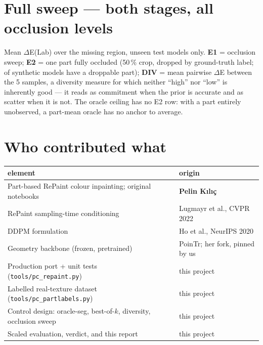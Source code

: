 \documentclass[11pt]{article}
\begin{document}
\clearpage
\appendix

\section{Full sweep --- both stages, all occlusion levels}\label{app:sweep}

\begin{center}\footnotesize\setlength{\tabcolsep}{5pt}

\end{center}

\noindent Mean $\Delta$E(Lab) over the missing region, unseen test models only.
\textbf{E1} = occlusion sweep; \textbf{E2} = one part fully occluded (50\,\% crop, dropped by
ground-truth label; \winENS{} of \nmodS{} synthetic models have a droppable part);
\textbf{DIV} = mean pairwise $\Delta$E between the 5 samples, a diversity measure for which
neither ``high'' nor ``low'' is inherently good --- it reads as commitment when the prior is
accurate and as scatter when it is not. The oracle ceiling has no E2 row: with a part entirely
unobserved, a part-mean oracle has no anchor to average.

\section{Who contributed what}\label{app:credit}

\begin{center}\small
\begin{tabular}{ll}
\toprule
element & origin \\
\midrule
Part-based RePaint colour inpainting; original notebooks & \textbf{Pelin K\i l\i\c{c}} \\
RePaint sampling-time conditioning & Lugmayr et al., CVPR 2022 \\
DDPM formulation & Ho et al., NeurIPS 2020 \\
Geometry backbone (frozen, pretrained) & PoinTr; her fork, pinned by us \\
\midrule
Production port + unit tests (\texttt{tools/pc\_repaint.py}) & this project \\
Labelled real-texture dataset (\texttt{tools/pc\_partlabels.py}) & this project \\
Control design: oracle-seg, best-of-$k$, diversity, occlusion sweep & this project \\
Scaled evaluation, verdict, and this report & this project \\
\bottomrule
\end{tabular}
\end{center}
\end{document}
